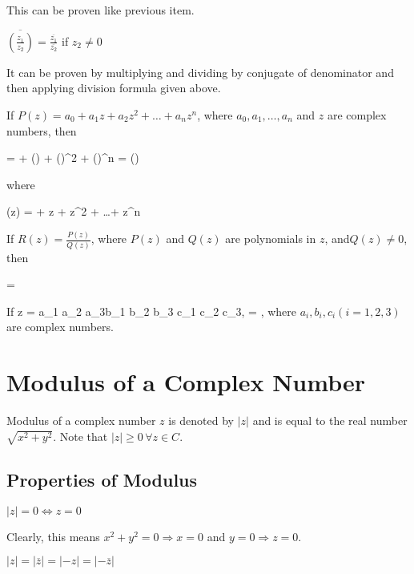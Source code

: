   This can be proven like previous item.
\item $\overline{\left(\frac{z_1}{z_2}\right)} = \frac{\overline{z_1}}{\overline{z_2}}$ if $z_2\neq 0$

  It can be proven by multiplying and dividing by conjugate of denominator and then applying division formula given above.
\item If $P(z) = a_0 + a_1z + a_2z^2 + \ldots + a_nz^n$, where $a_0, a_1, \ldots, a_n$ and $z$ are complex numbers, then

  \startformula {} =  + () + ()^2 +
  ()^n = ()\stopformula

  where

  \startformula {}(z) =  + z + z^2 + \ldots + z^n\stopformula
\item If $R(z) = \frac{P(z)}{Q(z)}$, where $P(z)$ and $Q(z)$ are polynomials in $z$, and$Q(z) \neq 0$, then

  \startformula {} = \stopformula
\item If \startformula z = \startdeterminant \NC a_1 \NC a_2 \NC a_3\NR \NC b_1 \NC b_2 \NC b_3 \NR \NC c_1 \NC c_2 \NC c_3\NR\stopdeterminant, \;\;
  = \startdeterminant\NC{} \NC {} \NC {}\NR\NC {} \NC {} \NC {}
    \NR \NC{} \NC {} \NC {}\NR\stopdeterminant,\stopformula
  where $a_i, b_i, c_i(i = 1,2,3)$ are complex numbers.
\stopitemize

\section{Modulus of a Complex Number}
Modulus of a complex number $z$ is denoted by $|z|$ and is equal to the real number $\sqrt{x^2 + y^2}$. Note that $|z| \geq
0\,\forall z \in C$.
\subsection{Properties of Modulus}
\startitemize[n]
\item $|z| = 0 \Leftrightarrow z = 0$

  Clearly, this means $x^2 + y^2 = 0 \Rightarrow x = 0$ and $y = 0 \Rightarrow z = 0$.
\item $|z| = |\overline{z}| = |-z| = |-\overline{z}|$

